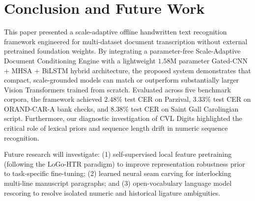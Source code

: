 \documentclass{IEEEtran}
\begin{document}
\section{Conclusion and Future Work}

\label{sec:conclusion}

This paper presented a scale-adaptive offline handwritten text recognition framework engineered for multi-dataset document transcription without external pretrained foundation weights. By integrating a parameter-free Scale-Adaptive Document Conditioning Engine with a lightweight $1.58\text{M}$ parameter Gated-CNN + MHSA + BiLSTM hybrid architecture, the proposed system demonstrates that compact, scale-grounded models can match or outperform substantially larger Vision Transformers trained from scratch. Evaluated across five benchmark corpora, the framework achieved $2.48\%$ test CER on Parzival, $3.33\%$ test CER on ORAND-CAR-A bank checks, and $8.38\%$ test CER on Saint Gall Carolingian script. Furthermore, our diagnostic investigation of CVL Digits highlighted the critical role of lexical priors and sequence length drift in numeric sequence recognition.

Future research will investigate: (1) self-supervised local feature pretraining (following the LoGo-HTR paradigm) to improve representation robustness prior to task-specific fine-tuning; (2) learned neural seam carving for interlocking multi-line manuscript paragraphs; and (3) open-vocabulary language model rescoring to resolve isolated numeric and historical ligature ambiguities.
\end{document}
